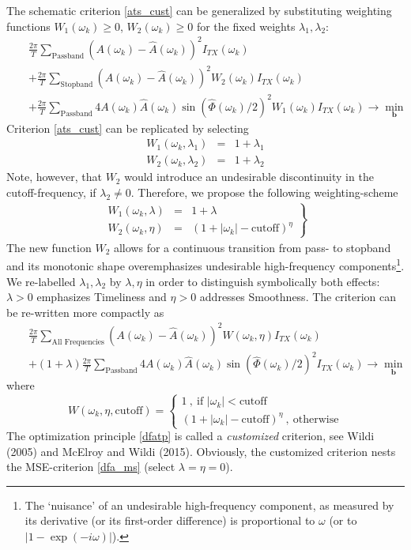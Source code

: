 \documentclass[a4paper]{book}
\begin{document}
The schematic criterion \ref{ats_cust} can be generalized by substituting weighting functions $W_1(\omega_k)\geq 0$, $W_2(\omega_k)\geq 0$  for the fixed weights $\lambda_1,\lambda_2$:
\begin{eqnarray*}
&&\frac{2\pi}{ T} \sum_{\textrm{Passband}} (A(\omega_k)-\hat{A}(\omega_k))^2 I_{TX}(\omega_k)\nonumber\\
&&+\frac{2\pi}{ T} \sum_{\textrm{Stopband}} (A(\omega_k)-\hat{A}(\omega_k))^2 W_2(\omega_k)I_{TX}(\omega_k)\nonumber\\
&&+\frac{2\pi}{ T}  \sum_{\textrm{Passband}} 4A(\omega_k)\hat{A}(\omega_k)\sin(\hat{\Phi}(\omega_k)/2)^2
W_1(\omega_k)I_{TX}(\omega_k)\to\min_{\mathbf{b}}
\end{eqnarray*}
Criterion \ref{ats_cust} can be replicated by selecting
\begin{eqnarray*}
W_1(\omega_k,\lambda_1)&=&1+\lambda_1\\
W_2(\omega_k,\lambda_2)&=&1+\lambda_2
\end{eqnarray*}
Note, however, that $W_2$ would introduce an undesirable discontinuity in the cutoff-frequency, if $\lambda_2\neq 0$. Therefore, we propose the following weighting-scheme
\begin{eqnarray}
\left.\begin{array}{ccc}W_1(\omega_k,\lambda)&=&1+\lambda\\
W_2(\omega_k,\eta)&=&(1+|\omega_k|-\textrm{cutoff})^{\eta}
\end{array}\right\}\label{w_func_cust}
\end{eqnarray}
The new function $W_2$ allows for a continuous transition from pass- to stopband and its monotonic shape overemphasizes undesirable high-frequency components\footnote{The `nuisance' of an undesirable high-frequency component, as measured by its derivative (or its first-order difference) is proportional to $\omega$ (or to $|1-\exp(-i\omega)|$).}. We re-labelled
$\lambda_1,\lambda_2$ by $\lambda,\eta$ in order to distinguish symbolically both effects: $\lambda>0$ emphasizes Timeliness and $\eta>0$ addresses Smoothness. The criterion can be re-written more compactly as
\begin{eqnarray}
&&\frac{2\pi}{ T} \sum_{\textrm{All~Frequencies}} (A(\omega_k)-\hat{A}(\omega_k))^2 W(\omega_k,\eta) I_{TX}(\omega_k)\nonumber\\
&&+(1+\lambda)\frac{2\pi}{ T}  \sum_{\textrm{Passband}} 4A(\omega_k)\hat{A}(\omega_k)\sin(\hat{\Phi}(\omega_k)/2)^2
I_{TX}(\omega_k)\to\min_{\mathbf{b}}\label{dfatp}
\end{eqnarray}
where
\begin{equation}\label{w}
W(\omega_k,\eta,\textrm{cutoff})=\left\{\begin{array}{cc}
1~,~\textrm{if~} |\omega_k|<\textrm{cutoff}\\
(1+|\omega_k|-\textrm{cutoff})^{\eta}~,~\textrm{otherwise}
\end{array}\right.
\end{equation}
The optimization principle \ref{dfatp} is called a \emph{customized} criterion, see Wildi (2005) and McElroy and Wildi (2015). Obviously, the customized criterion nests the MSE-criterion \ref{dfa_ms} (select $\lambda=\eta=0$).  
\end{document}
